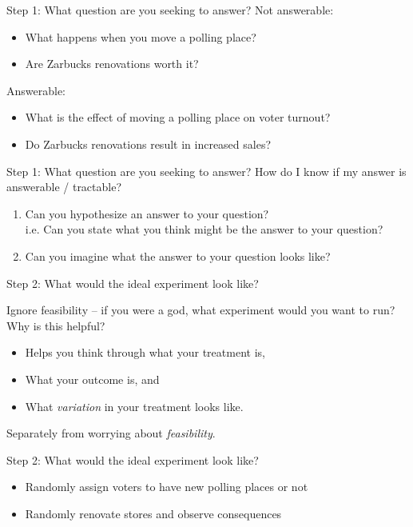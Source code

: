 \documentclass[11pt]{beamer}
\begin{document}
\begin{frame}[c]{Step 1: What \alert{question} are you seeking to answer?}
Not answerable:
\begin{itemize}
  \item What happens when you move a polling place?
  \item Are Zarbucks renovations worth it?
\end{itemize}
\pause
Answerable:
\begin{itemize}
  \item What is the effect of moving a polling place on voter turnout?
  \item Do Zarbucks renovations result in increased sales?
\end{itemize}
\end{frame}

\begin{frame}[c]{Step 1: What \alert{question} are you seeking to answer?}
How do I know if my answer is answerable / tractable?

\begin{enumerate}
  \pause \item Can you hypothesize an answer to your question? \\
  i.e. Can you state what you think might be the answer to your question?
  \pause \item Can you imagine what the answer to your question looks like?
\end{enumerate}
\end{frame}



\begin{frame}[c]{Step 2: What would the \alert{ideal experiment} look like?}

Ignore feasibility -- if you were a god, what experiment would you want to run?
\pause
\vspace{1cm}
Why is this helpful?
\begin{itemize}
  \item Helps you think through what your \alert{treatment} is,
  \item What your outcome is, and
  \item What \emph{variation} in your treatment looks like.
\end{itemize}
Separately from worrying about \emph{feasibility}.
\end{frame}

\begin{frame}[c]{Step 2: What would the \alert{ideal experiment} look like?}
\begin{itemize}
  \item Randomly assign voters to have new polling places or not
  \item Randomly renovate stores and observe consequences
\end{itemize}
\end{frame}
\end{document}
